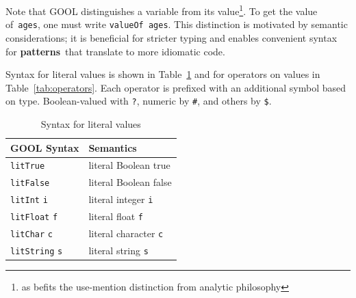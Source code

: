 \documentclass[sigplan,review,anonymous,prologue,dvipsnames]{acmart}
\newcommand{\abbrev}[1]{\textbf{#1}}
\newcommand{\oopatterns}{\abbrev{patterns}}
\begin{document}
Note that GOOL distinguishes a variable from its value\footnote{
as befits the use-mention distinction from analytic philosophy}. To get
the value of~\verb|ages|, one must write \verb|valueOf ages|. This distinction 
is motivated by semantic considerations; it is beneficial for stricter typing 
and enables convenient syntax for \oopatterns~that translate to more idiomatic
code.

Syntax for literal values is shown in Table~\ref{tab:literals} and for
operators on values in Table~\ref{tab:operators}. Each
operator is prefixed with an additional symbol based on type. 
Boolean-valued with \verb|?|, numeric by \verb|#|, and others by \verb|$|.

\begin{table}[ht]
  \caption{Syntax for literal values}
  \begin{tabular}{p{} p{}}
    \textbf{GOOL Syntax} & \textbf{Semantics} \\
    \midrule
    \verb|litTrue| & literal Boolean true \\
    \verb|litFalse| & literal Boolean false \\
    \verb|litInt| \verb|i| & literal integer \verb|i| \\
    \verb|litFloat| \verb|f| & literal float \verb|f| \\
    \verb|litChar| \verb|c| & literal character \verb|c| \\
    \verb|litString| \verb|s| & literal string \verb|s| \\
  \end{tabular}
  \label{tab:literals}
\end{table}
\end{document}
